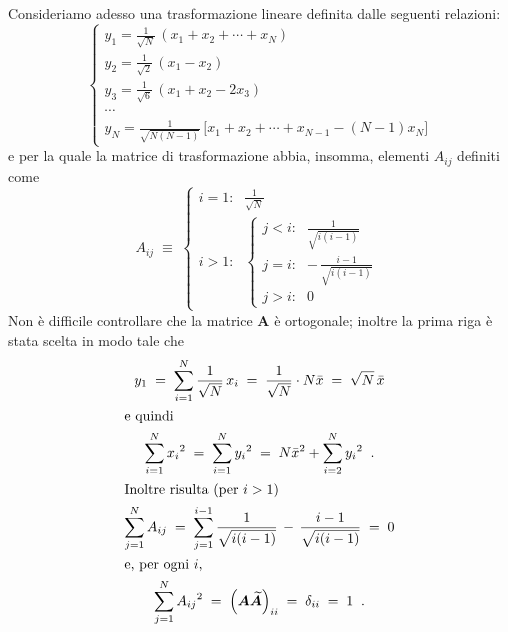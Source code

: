 Consideriamo adesso una trasformazione lineare definita
dalle seguenti relazioni:
\begin{equation} \label{eq:12.hack}
  \begin{cases}
    y_1 = \displaystyle \frac{1}{\sqrt{N}} \, (x_1 +
      x_2 +\cdots+ x_N) \\[2ex]
    y_2 = \displaystyle \frac{1}{\sqrt{2}} \, (x_1 -
      x_2) \\[2ex]
    y_3 = \displaystyle \frac{1}{\sqrt{6}} \, (x_1 +
      x_2 - 2 x_3) \\[2ex]
    \cdots \\[1ex]
    y_N = \displaystyle \frac{1}{\sqrt{N(N-1)}} \,
      \bigl[ x_1 + x_2 +\cdots+ x_{N-1} - (N-1) x_N
      \bigr]
  \end{cases}
\end{equation}
e per la quale la matrice di trasformazione abbia, insomma,
elementi $A_{ij}$ definiti come
\begin{equation*}
  A_{ij} \; \equiv \;
  \begin{cases}
    \text{$i=1$:} &  \displaystyle \frac{1}{\sqrt{N}}
      \\[4ex]
    \text{$i>1$:} &
    \begin{cases}
      \text{$j<i$:} &  \displaystyle
        \frac{1}{\sqrt{i(i-1)}} \\[2ex]
      \text{$j=i$:} &  \displaystyle - \,
        \frac{i-1}{\sqrt{i(i-1)}} \\[2ex]
      \text{$j>i$:} &  \displaystyle 0
    \end{cases}
  \end{cases}
\end{equation*}
Non \`e difficile controllare che la matrice
$\boldsymbol{A}$ \`e ortogonale; inoltre la prima riga \`e
stata scelta in modo tale che
\begin{gather}
  y_1 \; = \; \sum_{i=1}^N \frac{1}{\sqrt{N}} \, x_i \;
    = \; \frac{1}{\sqrt{N}} \cdot N \bar x \; = \;
    \sqrt{N} \, \bar x \notag \\
  \intertext{e quindi}
  \sum_{i=1}^N {x_i}^2 \; = \; \sum_{i=1}^N {y_i}^2 \;
    = \; N {\bar x}^2 + \sum_{i=2}^N {y_i}^2 \;\; . \notag \\
  \intertext{Inoltre risulta (per $i > 1$)}
  \sum_{j=1}^N A_{ij} \; = \; \sum_{j=1}^{i-1}
    \frac{1}{\sqrt{i(i-1)}} \, - \,
    \frac{i-1}{\sqrt{i(i-1)}} \; = \; 0
    \label{eq:12.hackmean} \\
  \intertext{e, per ogni $i$,}
  \sum_{j=1}^N {A_{ij}}^2 \; = \; \left( \boldsymbol{A}
    \boldsymbol{\widetilde A} \right)_{ii} \; = \;
    \delta_{ii} \; = \; 1 \;\; . \label{eq:12.hackstd}
\end{gather}

